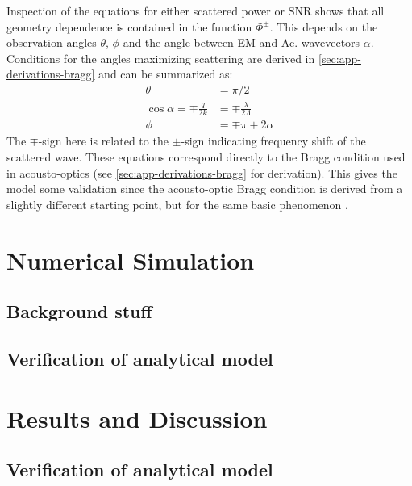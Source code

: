 \documentclass[10pt,a4paper]{eitExjobb}
\begin{document}
	Inspection of the equations for either scattered power or SNR shows that all geometry dependence is contained in the function $\Phi^\pm$. This depends on the observation angles $\theta$, $\phi$ and the angle between EM and Ac. wavevectors $\alpha$. Conditions for the angles maximizing scattering are derived in \ref{sec:app-derivations-bragg} and can be summarized as:
	\begin{align*}
	\theta &= \pi/2\\
	\cos{\alpha} = \mp \frac{q}{2k} &= \mp \frac{\lambda}{2\Lambda}\\
	\phi &= \mp \pi + 2\alpha
	\end{align*}
	The $\mp$-sign here is related to the $\pm$-sign indicating frequency shift of the scattered wave. These equations correspond directly to the Bragg condition used in acousto-optics (see \ref{sec:app-derivations-bragg} for derivation). This gives the model some validation since the acousto-optic Bragg condition is derived from a slightly different starting point, but for the same basic phenomenon \cite{Saleh2007}.
	
	\chapter{Numerical Simulation}
	
	\section{Background stuff}
	
	\section{Verification of analytical model}
	
	\chapter{Results and Discussion}
	
	\section{Verification of analytical model}
	
\end{document}
